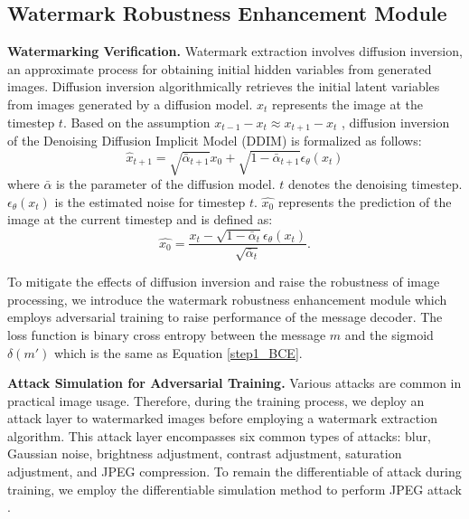 \subsection{Watermark Robustness Enhancement Module}
\noindent\textbf{Watermarking Verification.} Watermark extraction involves diffusion inversion, an approximate process for obtaining initial hidden variables from generated images. 
Diffusion inversion \cite{dhariwal2021diffusion} algorithmically retrieves the initial latent variables from images generated by a diffusion model. $x_t$ represents the image at the timestep $t$. Based on the assumption $x_{t-1} - x_t 
\approx x_{t+1} - x_t$ , diffusion inversion of the Denoising Diffusion Implicit Model (DDIM) \cite{song2020denoising}  is formalized as follows:
\begin{equation}
\hat{x}_{t+1}=\sqrt{\bar{\alpha}_{t+1}} x_{0}+\sqrt{1-\bar{\alpha}_{t+1}} \epsilon_{\theta}(x_{t})
\end{equation}
where $\bar{\alpha}$ is the parameter of the diffusion model. $t$ denotes the denoising timestep.  $\epsilon_\theta(x_t)$ is the estimated noise for timestep $t$.
$\hat{x_{0}}$ represents the prediction of the image at the current timestep and is defined as:
\begin{equation}
    \hat{x_{0}}=\frac{x_{t}-\sqrt{1-\bar{\alpha}_{t}} \epsilon_{\theta}\left(x_{t}\right)}{\sqrt{\bar{\alpha}_{t}}}.
\end{equation}


To mitigate the effects of diffusion inversion and raise the robustness of image processing, we introduce the watermark robustness enhancement module which employs adversarial training to raise performance of the message decoder.
The loss function is binary cross entropy between the message $m$ and the sigmoid $\delta(m')$ which is the same as Equation \ref{step1_BCE}.






\noindent\textbf{Attack Simulation for Adversarial Training.} Various attacks are common in practical image usage. Therefore, during the training process, we deploy an attack layer to watermarked images before employing a watermark extraction algorithm. This attack layer encompasses six common types of attacks: blur, Gaussian noise, brightness adjustment, contrast adjustment, saturation adjustment, and JPEG compression. To remain the differentiable of attack during training, we employ the differentiable simulation method to perform JPEG attack \cite{zhu2018hidden}.

